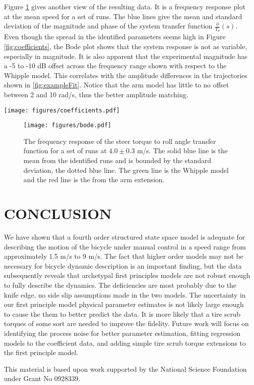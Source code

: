 \documentclass[twocolumn,10pt]{asme2e}
\begin{document}
Figure \ref{fig:bode} gives another view of the resulting data. It is a
frequency response plot at the mean speed for a set of runs. The blue lines
give the mean and standard deviation of the magnitude and phase of the system
transfer function \(\frac{\phi}{T_\delta}(s)\). Even though the spread in
the identified parameters seems high in Figure \ref{fig:coefficients}, the Bode
plot shows that the system response is not as variable, especially in magnitude.
It is also apparent that the experimental magnitude has a -5 to -10 dB offset
across the frequency range shown with respect to the Whipple model. This
correlates with the amplitude differences in the trajectories shown in
\ref{fig:exampleFit}. Notice that the arm model has little to no offset between
2 and 10 rad/s, thus the better amplitude matching.

\begin{figure*}
	\texttt{[image: figures/coefficients.pdf]}
	\caption{The coefficients of the linear dynamical equations of motion plotted
	as a function of speed. Each blue dot is a single experiment. The green line
	is the Whipple model and the red line is the arm model. Only experiments
	with a mean fit percentage greater than zero are shown.}
	\label{fig:coefficients}
\end{figure*}

\begin{figure}
	\texttt{[image: figures/bode.pdf]}
	\caption{The frequency response of the steer torque to roll angle transfer
	function for a set of runs at $4.0 \pm 0.3$ m/s. The solid blue line is the
	mean from the identified runs and is bounded by the standard deviation, the
	dotted blue line. The green line is the Whipple model and the red line is the
	from the arm extension.}
	\label{fig:bode}
\end{figure}

\section*{CONCLUSION}
We have shown that a fourth order structured state space model is adequate for
describing the motion of the bicycle under manual control in a speed range from
approximately 1.5 m/s to 9 m/s. The fact that higher order models may not be
necessary for bicycle dynamic description is an important finding, but the
data subsequently reveals that archetypal first principles models are not
robust enough to fully describe the dynamics. The deficiencies are most
probably due to the knife edge, no side slip assumptions made in the two
models. The uncertainty in our first principle model physical parameter estimates
is not likely large enough to cause the them to better predict the data. It is
more likely that a tire scrub torques of some sort are needed to improve the
fidelity. Future work will focus on identifying the process noise for better
parameter estimation, fitting regression models to the coefficient data, and
adding simple tire scrub torque extensions to the first principle model.

\begin{acknowledgment}
	This material is based upon work supported by the National Science Foundation
	under Grant No 0928339.
\end{acknowledgment}



\end{document}
